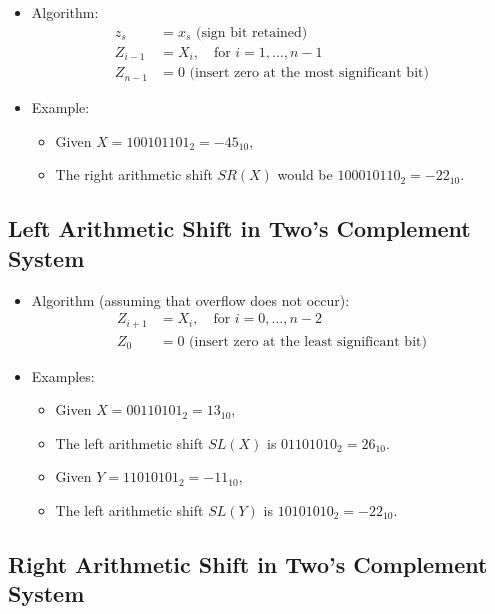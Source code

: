 \documentclass[12pt,openany, tikz,border=10pt]{book}
\begin{document}
\begin{itemize}
    \item[] Algorithm:
    \begin{align*}
        z_s &= x_s \text{ (sign bit retained)} \\
        Z_{i-1} &= X_i, \quad \text{for } i = 1, \ldots, n - 1 \\
        Z_{n-1} &= 0 \text{ (insert zero at the most significant bit)}
    \end{align*}
    \item[] Example:
    \begin{itemize}
        \item[] Given \( X = 100101101_2 = -45_{10} \),
        \item[] The right arithmetic shift \( SR(X) \) would be \( 100010110_2 = -22_{10} \).
    \end{itemize}
\end{itemize}

\newpage
\subsection{Left Arithmetic Shift in Two's Complement System}

\begin{itemize}
    \item[] Algorithm (assuming that overflow does not occur):
    \begin{align*}
        Z_{i+1} &= X_{i}, \quad \text{for } i = 0, \ldots, n-2 \\
        Z_{0} &= 0 \text{ (insert zero at the least significant bit)}
    \end{align*}
    \item[] Examples:
    \begin{itemize}
        \item[] Given \( X = 00110101_2 = 13_{10} \),
        \item[] The left arithmetic shift \( SL(X) \) is \( 01101010_2 = 26_{10} \).
        \item[] Given \( Y = 11010101_2 = -11_{10} \),
        \item[] The left arithmetic shift \( SL(Y) \) is \( 10101010_2 = -22_{10} \).
    \end{itemize}
\end{itemize}



\subsection{Right Arithmetic Shift in Two's Complement System}
\end{document}
